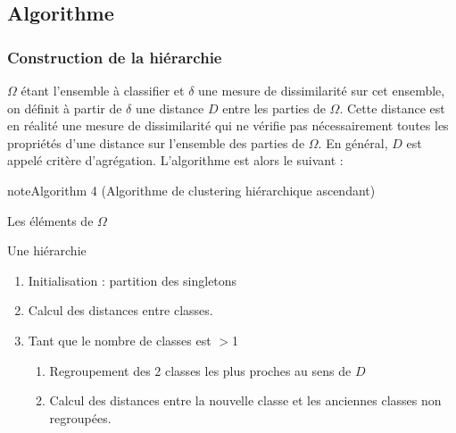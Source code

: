 \documentclass[letterpaper,10pt,english]{jupyterBook}
\begin{document}
\subsection{Algorithme}
\label{\detokenize{clustering:algorithme}}
\ignorespaces 

\subsubsection{Construction de la hiérarchie}
\label{\detokenize{clustering:construction-de-la-hierarchie}}\label{\detokenize{clustering:index-2}}
\sphinxAtStartPar
\(\Omega\)  étant l’ensemble à classifier et \(\delta\) une mesure de dissimilarité sur cet ensemble, on définit à partir de \(\delta\) une  distance \(D\) entre les parties de  \(\Omega\). Cette distance est en réalité une mesure de dissimilarité qui ne vérifie pas nécessairement toutes les propriétés d’une distance sur l’ensemble des parties de \(\Omega\). En général, \(D\) est appelé critère d’agrégation.
L’algorithme est alors le suivant :
\label{clustering:algorithm-3}
\begin{sphinxadmonition}{note}{Algorithm 4 (Algorithme de clustering hiérarchique ascendant)}



\sphinxAtStartPar
{} Les éléments de \(\Omega\)

\sphinxAtStartPar
{} Une hiérarchie
\begin{enumerate}
%
\item {} 
\sphinxAtStartPar
Initialisation : partition des singletons

\item {} 
\sphinxAtStartPar
Calcul des distances entre classes.

\item {} 
\sphinxAtStartPar
Tant que le nombre de classes est \(>\)1
\begin{enumerate}
%
\item {} 
\sphinxAtStartPar
Regroupement des 2 classes les plus proches au sens de \(D\)

\item {} 
\sphinxAtStartPar
Calcul des distances entre la nouvelle classe et les anciennes classes non regroupées.

\end{enumerate}

\end{enumerate}
\end{sphinxadmonition}
\end{document}
